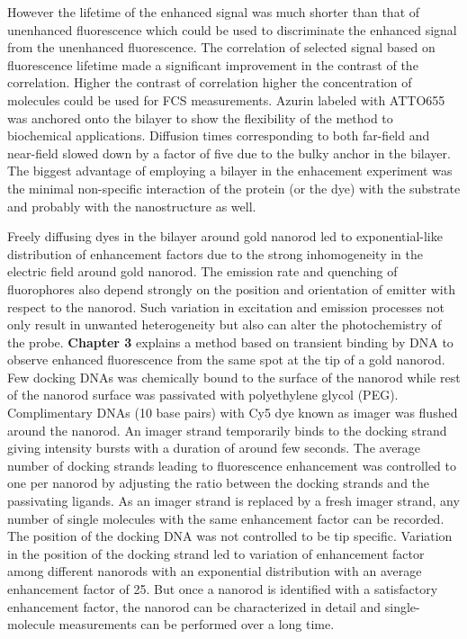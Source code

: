 However the lifetime of the enhanced signal was much shorter than that of unenhanced fluorescence which could be used to discriminate the enhanced signal from the unenhanced fluorescence.
The correlation of selected signal based on fluorescence lifetime made a significant improvement in the contrast of the correlation.
Higher the contrast of correlation higher the concentration of molecules could be used for FCS measurements.
Azurin labeled with ATTO655 was anchored onto the bilayer to show the flexibility of the method to biochemical applications.
Diffusion times corresponding to both far-field and near-field slowed down by a factor of five due to the bulky anchor in the bilayer.
The biggest advantage of employing a bilayer in the enhacement experiment was the minimal non-specific interaction of the protein (or the dye) with the substrate and probably with the nanostructure as well.


Freely diffusing dyes in the bilayer around gold nanorod led to exponential-like distribution of enhancement factors due to the strong inhomogeneity in the electric field around gold nanorod.
The emission rate and quenching of fluorophores also depend strongly on the position and orientation of emitter with respect to the nanorod.
Such variation in excitation and emission processes not only result in unwanted heterogeneity but also can alter the photochemistry of the probe.
\textbf{Chapter 3} explains a method based on transient binding by DNA to observe enhanced fluorescence from the same spot at the tip of a gold nanorod.
Few docking DNAs was chemically bound to the surface of the nanorod while rest of the nanorod surface was passivated with polyethylene glycol (PEG).
Complimentary DNAs (10 base pairs) with Cy5 dye known as imager was flushed around the nanorod.
An imager strand temporarily binds to the docking strand giving intensity bursts with a duration of around few seconds.
The average number of docking strands leading to fluorescence enhancement was controlled to one per nanorod by adjusting the ratio between the docking strands and the passivating ligands.
As an imager strand is replaced by a fresh imager strand, any number of single molecules with the same enhancement factor can be recorded.
The position of the docking DNA was not controlled to be tip specific.
Variation in the position of the docking strand led to variation of enhancement factor among different nanorods with an exponential distribution with an average enhancement factor of 25.
But once a nanorod is identified with a satisfactory enhancement factor, the nanorod can be characterized in detail and single-molecule measurements can be performed over a long time.


